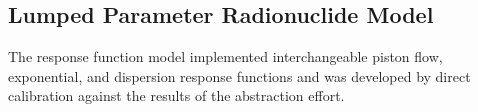 \subsection*{Lumped Parameter Radionuclide Model}\label{sec:lumped}

The response function model implemented interchangeable piston flow, 
exponential, and dispersion response functions and was developed by direct 
calibration against the results of the abstraction effort.  

